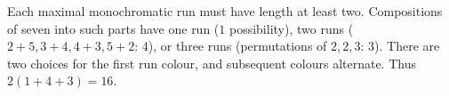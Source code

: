 Each maximal monochromatic run must have length at least two. Compositions of seven into such parts have one run ($1$ possibility), two runs ($2+5,3+4,4+3,5+2$: $4$), or three runs (permutations of $2,2,3$: $3$). There are two choices for the first run colour, and subsequent colours alternate. Thus $\boxed{2(1+4+3)=16}$.
